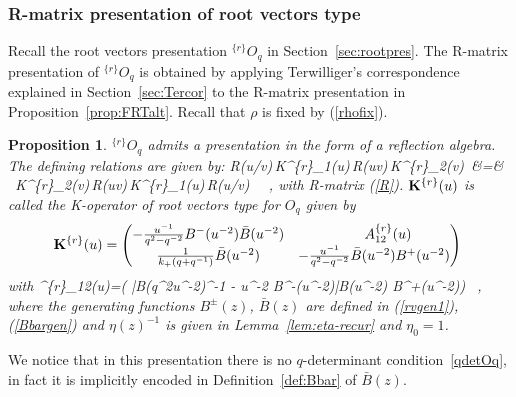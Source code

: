 \documentclass[11pt]{amsart}
\numberwithin{equation}{section}
\newtheorem{prop}[thm]{Proposition}
\numberwithin{equation}{section}
\begin{document}
\subsubsection{R-matrix presentation of root vectors type}
Recall the root vectors presentation $^{\{r\}}O_q$ in Section~\ref{sec:rootpres}.
The R-matrix presentation of $^{\{r\}}O_q$ is obtained by applying Terwilliger's correspondence explained in  Section~\ref{sec:Tercor} to the R-matrix presentation in Proposition~\ref{prop:FRTalt}.
Recall that $\rho$  is fixed by (\ref{rhofix}).  
	\begin{prop}\label{prop:FRTOqrv} $^{\{r\}}O_q$ admits a presentation in the form of a reflection algebra.
	The defining relations are given by:
	\beqa 
	R(u/v)\,{\bold K}^{\{r\}}_1(u)\,R(uv)\,{\bold K}^{\{r\}}_2(v)\
	&=& \ {\bold K}^{\{r\}}_2(v)\,R(uv)\,{\bold K}^{\{r\}}_1(u)\,R(u/v)\ 
	\label{REOqr} \ ,
	\eeqa
with R-matrix (\ref{R}). ${\bold K}^{\{r\}}(u)$ is called the {\it K-operator} of root vectors type for $O_q$ given by
	\begin{equation}
		{\bold K}^{\{r\}}(u)=\begin{pmatrix} 
			-\frac{u^{-1}}{q^2-q^{-2}}B^-(u^{-2}){\bar B}(u^{-2})  &  \qquad A^{\{r\}}_{12}(u)  \\ 
			\frac{1}{k_+(q+q^{-1})}{\bar B}(u^{-2}) & 	-\frac{u^{-1}}{q^2-q^{-2}}{\bar B}(u^{-2})B^+(u^{-2})
		\end{pmatrix}  \label{Kr-Oq} \ 
	\end{equation}
	with
	\beqa
	^{\{r\}}_{12}(u)=\left(    {\bar B}(q^2u^{-2})^{-1}  - u^{-2} B^{-}(u^{-2}){\bar B}(u^{-2})  B^{+}(u^{-2})\right)
	\ , \label{eq:expordK12r}
	\eeqa 
	\normalsize
	where the generating functions  $B^\pm(z)$, ${\bar B}(z)$ are defined in (\ref{rvgen1}), (\ref{Bbargen}) and $\eta(z)^{-1}$ is given in Lemma~\ref{lem:eta-recur} and $\eta_0=1$.
\end{prop}
 We notice that in this presentation there is no   $q$-determinant condition~\eqref{qdetOq}, in fact it is  implicitly encoded in Definition~\ref{def:Bbar} of $\bar B(z)$.
\end{document}
